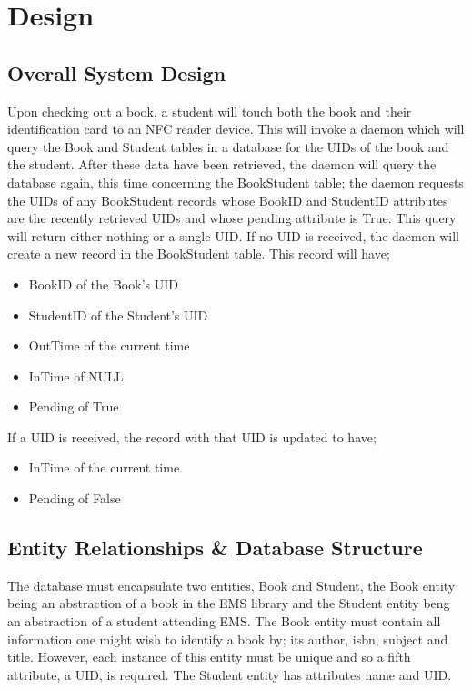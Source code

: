 \documentclass[draft]{book}
\begin{document}

\chapter{Design}

\section{Overall System Design}

Upon checking out a book, a student will touch both the book and their identification card to an NFC reader device. This will invoke a daemon which will query the Book and Student tables in a database for the UIDs of the book and the student. After these data have been retrieved, the daemon will query the database again, this time concerning the BookStudent table; the daemon requests the UIDs of any BookStudent records whose BookID and StudentID attributes are the recently retrieved UIDs and whose pending attribute is True. This query will return either nothing or a single UID. If no UID is received, the daemon will create a new record in the BookStudent table. This record will have;\begin{itemize}

    \item BookID of the Book's UID
    \item StudentID of the Student's UID
    \item OutTime of the current time
    \item InTime of NULL
    \item Pending of True

\end{itemize} If a UID is received, the record with that UID is updated to have;\begin{itemize}

    \item InTime of the current time
    \item Pending of False

\end{itemize}

\section{Entity Relationships \& Database Structure}

The database must encapsulate two entities, Book and Student, the Book entity being an abstraction of a book in the EMS library and the Student entity beng an abstraction of a student attending EMS. The Book entity must contain all information one might wish to identify a book by; its author, isbn, subject and title. However, each instance of this entity must be unique and so a fifth attribute, a UID, is required. The Student entity has attributes name and UID.
\end{document}
